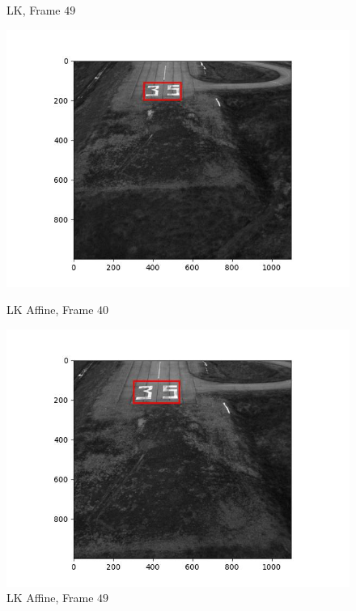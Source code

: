 \begin{figure}[H]
\begin{minipage}{.45\textwidth}
    \caption{LK, Frame $49$}
  \end{minipage}
  \begin{minipage}{.45\textwidth}
    \centering
    \includegraphics[width=\textwidth]{./figures/lk_affine/landing/frame000040.jpg}
    \caption{LK Affine, Frame $40$}
  \end{minipage}
  \begin{minipage}{.45\textwidth}
    \centering
    \includegraphics[width=\textwidth]{./figures/lk_affine/landing/frame000049.jpg}
    \caption{LK Affine, Frame $49$}
  \end{minipage}
  \begin{minipage}{.45\textwidth}
    \centering

\end{minipage}
\end{figure}
